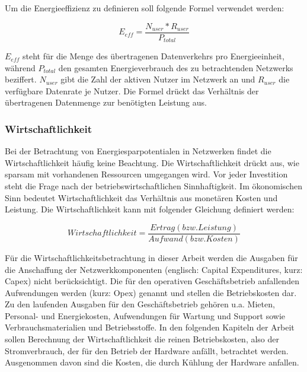 Um die Energieeffizienz zu definieren soll folgende Formel verwendet werden:

\begin{equation}
E_{eff}=\frac{N_{user}*R_{user}}{P_{total}}
\end{equation}

$E_{eff}$ steht für die Menge des übertragenen Datenverkehrs pro Energieeinheit, während $P_{total}$ den gesamten Energieverbrauch des zu betrachtenden Netzwerks beziffert. $N_{user}$ gibt die Zahl der aktiven Nutzer im Netzwerk an und $R_{user}$ die verfügbare Datenrate je Nutzer. \cite{aleksic2013}
Die Formel drückt das Verhältnis der übertragenen Datenmenge zur benötigten Leistung aus.

\subsubsection{Wirtschaftlichkeit}
Bei der Betrachtung von Energiesparpotentialen in Netzwerken findet die Wirtschaftlichkeit häufig keine Beachtung. Die Wirtschaftlichkeit drückt aus, wie sparsam mit vorhandenen Ressourcen umgegangen wird.  Vor jeder Investition steht die Frage nach der betriebswirtschaftlichen Sinnhaftigkeit. Im ökonomischen Sinn bedeutet Wirtschaftlichkeit das Verhältnis aus monetären Kosten und Leistung. Die Wirtschaftlichkeit kann mit folgender Gleichung definiert werden:

\begin{equation}
Wirtschaftlichkeit=\frac{Ertrag (bzw. Leistung)}{Aufwand(bzw. Kosten)}
\end{equation}


Für die Wirtschaftlichkeitsbetrachtung in dieser Arbeit werden die Ausgaben für die Anschaffung der Netzwerkkomponenten (englisch: Capital Expenditures, kurz: Capex) nicht be\-rück\-sich\-tigt. Die für den operativen Geschäftsbetrieb anfallenden Aufwendungen werden  (kurz: Opex) genannt und stellen die Betriebskosten dar. Zu den laufenden Ausgaben für den Geschäfts\-betrieb gehören u.a. Mieten, Personal- und Energiekosten, Aufwendungen für Wartung und Support sowie Verbrauchsmaterialien und Betriebsstoffe. In den folgenden Kapiteln der Arbeit sollen Berechnung der Wirtschaftlichkeit die reinen Betriebskosten, also der Stromverbrauch, der für den Betrieb der Hardware anfällt, betrachtet werden. Ausgenommen davon sind die Kosten, die durch Kühlung der Hardware anfallen. 


